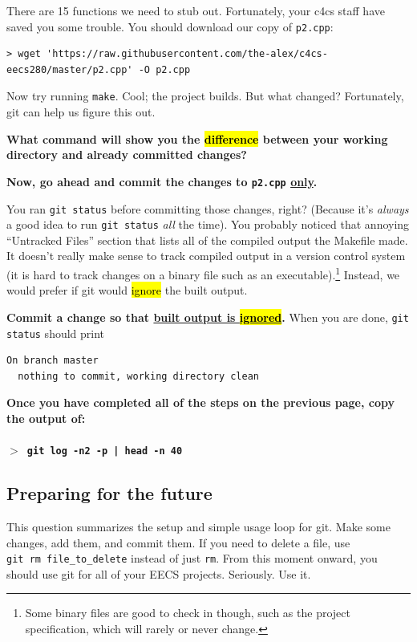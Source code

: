 \documentclass{article}
\begin{document}
\medskip
\noindent
There are 15 functions we need to stub out. Fortunately, your c4cs staff have
saved you some trouble. You should download our copy of \texttt{p2.cpp}:

\begin{Verbatim}[fontsize=\footnotesize]
> wget 'https://raw.githubusercontent.com/the-alex/c4cs-eecs280/master/p2.cpp' -O p2.cpp
\end{Verbatim}

\noindent
Now try running \texttt{make}. Cool; the project builds. But what changed?
Fortunately, git can help us figure this out.

\textbf{What command will show you the \hl{difference} between your working
directory and already committed changes?}

\vspace{1.0cm}
\noindent
\textbf{Now, go ahead and commit the changes to \texttt{p2.cpp} \underline{only}.}

\newpage

\medskip
\noindent
You ran \texttt{git status} before committing those changes, right? (Because
it's \emph{always} a good idea to run \texttt{git status} \emph{all} the time).
You probably noticed that annoying ``Untracked Files'' section that
lists all of the compiled output the Makefile made. It doesn't really make
sense to track compiled output in a version control system (it is hard to
track changes on a binary file such as an executable).\footnote{%
  Some binary files are good to check in though, such as the project
  specification, which will rarely or never change.
}
Instead, we would prefer if git would \hl{ignore} the built output.

\medskip
\noindent
\textbf{Commit a change so that \underline{built output is \hl{ignored}}.} When you are done,
\texttt{git status} should print
\begin{Verbatim}[fontsize=\footnotesize]
  On branch master
  nothing to commit, working directory clean
\end{Verbatim}

\bigskip
\textbf{Once you have completed all of the steps on the previous page, copy
the output of:\\
~\\
\texttt{$>$ git log -n2 -p | head -n 40}}

\vfill

\subsection{Preparing for the future}
\noindent
This question summarizes the setup and simple usage loop for git. Make some
changes, add them, and commit them. If you need to delete a file, use
\texttt{git~rm~file\_to\_delete} instead of just \texttt{rm}. From this moment
onward, you should use git for all of your EECS projects. Seriously. Use it.
\end{document}
